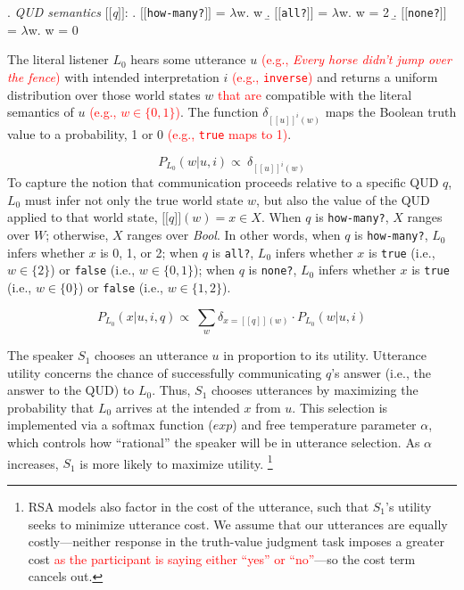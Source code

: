 \documentclass[preprint,authoryear]{elsarticle}\frenchspacing
\newcommand{\sem}[1]{\mbox{$[\![$#1$]\!]$}}
\newcommand{\lam}{\ensuremath{\lambda}}
\newcommand{\lp}[1]{\textcolor{red}{#1}} %
\begin{document}
\ex. \label{ex:qud-sem1} \emph{QUD semantics} \sem{\textit{q}}:
\a. \sem{\texttt{how-many?}} = \lam w. w
\b. \sem{\texttt{all?}} = \lam w. w = 2
\b. \sem{\texttt{none?}} = \lam w. w = 0


The literal listener $L_0$ hears some utterance $u$ 
\lp{(e.g., \textit{Every horse didn't jump over the fence})}
with intended interpretation $i$ 
\lp{(e.g., \texttt{inverse})}
and returns a uniform distribution over those world states $w$ \lp{that are} compatible with the literal semantics of $u$
\lp{(e.g., $w \in \{0,1\}$)}.
 The function $\delta_{[\![u]\!]^{i}(w)}$ maps the Boolean truth value to a probability, 1 or 0
\lp{(e.g., \texttt{true} maps to 1)}.

\begin{equation*}
P_{L_{0}} (w | u, i) \propto \ \delta_{[\![u]\!]^{i}(w)}
\end{equation*}
To capture the notion that communication proceeds relative to a specific QUD $q$, $L_0$ must infer not only the true world state $w$, but also the value of the QUD applied to that world state, $\sem{$q$}(w) = x \in X$. When $q$ is \texttt{how-many?}, $X$ ranges over $W$; otherwise, $X$ ranges over \emph{Bool}. In other words, when $q$ is \texttt{how-many?}, $L_0$ infers whether $x$ is 0, 1, or 2; when $q$ is \texttt{all?}, $L_0$ infers whether $x$ is \texttt{true} (i.e., $w \in \{2\}$) or \texttt{false} (i.e., $w \in \{0, 1\}$); when $q$ is \texttt{none?}, $L_0$ infers whether $x$ is \texttt{true} (i.e., $w \in \{0\}$) or \texttt{false} (i.e., $w \in \{1, 2\}$).

\begin{equation*}
P_{L_{0}} (x | u, i, q) \propto \ \sum_{w}\delta_{x=[\! [ q ]\! ](w)} \cdot P_{L_{0}} (w | u, i)
\end{equation*}

The speaker $S_1$ chooses an utterance $u$ in proportion to its utility. Utterance utility concerns the chance of successfully communicating $q$'s answer (i.e., the answer to the QUD) to $L_0$. Thus, $S_1$ chooses utterances by maximizing the probability that $L_0$ arrives at the intended $x$ from $u$. This selection is implemented via a softmax function ($exp$) and free temperature parameter $\alpha$, which controls how ``rational'' the speaker will be in utterance selection. As $\alpha$ increases, $S_1$ is more likely to maximize utility.
\footnote{RSA models also factor in the cost of the utterance, such that $S_1$'s utility seeks to minimize utterance cost. We assume that our utterances are equally costly---neither response in the truth-value judgment task imposes a greater cost \lp{as the participant is saying either ``yes'' or ``no''}---so the cost term cancels out.} 
\end{document}
